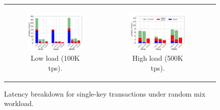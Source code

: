 \begin{figure}[hbt]
\centering
\begin{tabular}{ccc}
      \begin{subfigure}[t]{0.38\textwidth}
         \includegraphics[width=\textwidth]{figs/latency_allPUTGET.pdf}
        \caption[]{Low load (100K tps).}
        \label{fig:stack-brc}

      \end{subfigure}  
&
      \begin{subfigure}[t]{0.38\textwidth}
      	\includegraphics[width=\textwidth]{figs/latencyHighThrough_PUTGETRMW.pdf}
	\caption{High load (500K tps).}
	\label{fig:hightx}
      \end{subfigure}  & 

\end{tabular}
\vspace{-0.3cm}
       \caption{\small Latency breakdown  for single-key transactions under  random mix workload. }
       \vspace{-0.7cm}
\end{figure}

